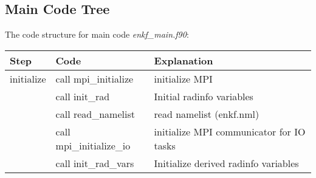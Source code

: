 \subsection{Main Code Tree}
The code structure for main code \textit{enkf\_main.f90}:
\begin{footnotesize}
\begin{center}
\begin{tabular}{| m{2cm} | p{4cm} | p{8cm} |}
\hline
Step&Code&Explanation\\
\hline
initialize &call mpi\_initialize & initialize MPI\\   \cline{2-3}
&call init\_rad &Initial radinfo variables \\  \cline{2-3}
&call read\_namelist &read namelist (enkf.nml)\\  \cline{2-3}
&call mpi\_initialize\_io&initialize MPI communicator for IO tasks\\ \cline{2-3}
&call init\_rad\_vars &Initialize derived radinfo variables\\
\hline


\end{tabular}
\end{center}
\end{footnotesize}
